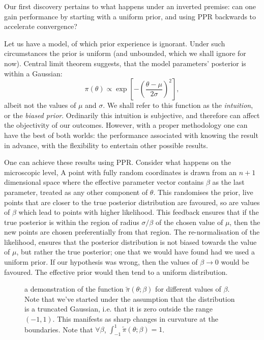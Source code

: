 \documentclass[usenatbib]{mnras}
\begin{document}
Our first discovery pertains to what happens under an inverted
premise: can one gain performance by starting with a uniform prior,
and using PPR backwards to accelerate convergence?

Let us have a model, of which prior experience is ignorant. Under
such circumstances the prior is uniform (and unbounded, which we
shall ignore for now). Central limit theorem suggests, that the
model parameters' posterior is within a Gaussian:
\begin{equation}
 \pi (\theta) \propto \exp \left[-\left(\frac{\theta - \mu}{2\sigma}\right)^{2} \right],
\end{equation}
albeit not the values of \(\mu\) and \(\sigma\). We shall refer to
this function as the \emph{intuition}, or the \emph{biased prior}. Ordinarily
this intuition is subjective, and therefore can affect the
objectivity of our outcomes. However, with a proper methodology one
can have the best of both worlds: the performance associated with
knowing the result in advance, with the flexibility to entertain
other possible results.

One can achieve these results using PPR. Consider what happens on
the microscopic level, A point with fully random coordinates is
drawn from an \(n+1\) dimensional space where the effective
parameter vector contains \(\beta\) as the last parameter, treated
as any other component of \(\theta\). This randomises the prior, live
points that are closer to the true posterior distribution are
favoured, so are values of \(\beta\) which lead to points with
higher likelihood.  This feedback ensures that if the true
posterior is within the region of radius \(\sigma / \beta\) of the
chosen value of \(\mu\), then the new points are chosen
preferentially from that region. The re-normalisation of the
likelihood, ensures that the posterior distribution is not biased
towards the value of \(\mu\), but rather the true posterior; one
that we would have found had we used a uniform prior. If our
hypothesis was wrong, then the values of \(\beta \rightarrow 0\)
would be favoured. The effective prior would then tend to a uniform
distribution.

\begin{figure}
 
\caption{\label{org7c81c17}
a demonstration of the function \(\tilde{\pi}(\theta; \beta)\) for different values of \(\beta\). Note that we've started under the assumption that the distribution is a truncated Gaussian, i.e. that it is zero outside the range \((-1, 1)\). This manifests as sharp changes in curvature at the boundaries. Note that \(\forall \beta\), \(\int_{-1}^{1}\tilde{\pi}(\theta; \beta) = 1\).}
\end{figure}
\end{document}
